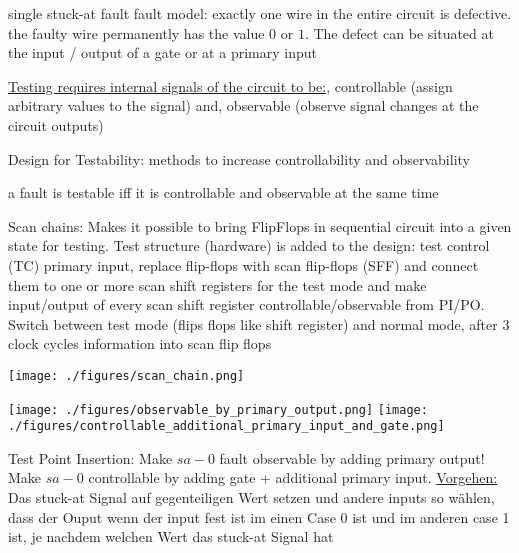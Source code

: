 \documentclass[landscape, a4paper]{article}
\begin{document}
\begin{minipage}[t]{0.2\linewidth}
\begin{betterlist}
		\item \alert{single stuck-at fault fault model:} exactly one wire in the entire circuit is defective. the faulty wire permanently has the value $0$ or $1$. The defect can be situated at the input / output of a gate or at a primary input
		\item \underline{Testing requires internal signals of the circuit to be:}, \alert{controllable} (assign arbitrary values to the signal) and, \alert{observable} (observe signal changes at the circuit outputs)
		\item \alert{Design for Testability:} methods to increase controllability and observability
		\item a fault is \alert{testable} iff it is controllable and observable at the same time
		\item \alert{Scan chains:} Makes it possible to bring FlipFlops in sequential circuit into a given state for testing. Test structure (hardware) is added to the design: test control (TC) primary input, replace flip-flops with scan flip-flops (SFF) and connect them to one or more scan shift registers for the test mode and make input/output of every scan shift register controllable/observable from PI/PO. Switch between test mode (flips flops like shift register) and normal mode, after $3$ clock cycles information into scan flip flops

		\begin{minipage}[b]{0.6\linewidth}
			\texttt{[image: ./figures/scan\_chain.png]}
		\end{minipage}
		\begin{minipage}[b]{0.4\linewidth}
			\texttt{[image: ./figures/observable\_by\_primary\_output.png]}
			\texttt{[image: ./figures/controllable\_additional\_primary\_input\_and\_gate.png]}
		\end{minipage}
		\item \alert{Test Point Insertion:} Make $sa-0$ fault observable by adding primary output! Make $sa-0$ controllable by adding gate + additional primary input. \underline{Vorgehen:} Das stuck-at Signal auf gegenteiligen Wert setzen und andere inputs so wählen, dass der Ouput wenn der input fest ist im einen Case 0 ist und im anderen case 1 ist, je nachdem welchen Wert das stuck-at Signal hat


\end{betterlist}
\end{minipage}
\end{document}
